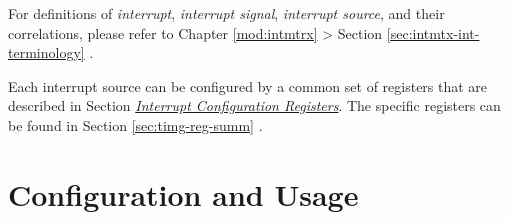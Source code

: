 \documentclass[main\_\_EN.tex]{subfiles}
\begin{document}
\begin{tiplisting}
For definitions of \textit{interrupt}, \textit{interrupt signal}, \textit{interrupt source}, and their correlations, please refer to Chapter \ref{mod:intmtrx} \textit{} > Section \ref{sec:intmtx-int-terminology} \textit{}.
\end{tiplisting}

Each interrupt source can be configured by a common set of registers that are described in Section \hyperref[interrupt-config-registers]{\textit{Interrupt Configuration Registers}}. The specific registers can be found in Section \ref{sec:timg-reg-summ} \textit{}.

\section{Configuration and Usage}
\end{document}
